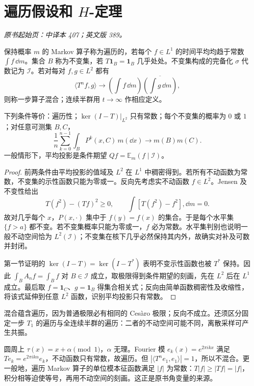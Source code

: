 \section{遍历假设和 \texorpdfstring{$H$}{H}-定理}\label{sec:yosida-13-03}
\noindent\textit{原书起始页：中译本 407；英文版 389。}

\begin{definition}[遍历与混合]
保持概率 $m$ 的 Markov 算子称为遍历的，若每个 $f\in L^1$ 的时间平均均趋于常数 $\int f\,\dd m$。集合 $B$ 称为不变集，若 $T\mathbf1_B=\mathbf1_B$ 几乎处处。不变集构成的完备化 $\sigma$ 代数记为 $\mathcal I$。若对每对 $f,g\in L^2$ 都有
\[
 \langle T^nf,g\rangle\longrightarrow
 \left(\int f\,\dd m\right)\overline{\left(\int g\,\dd m\right)},
\]
则称一步算子混合；连续半群用 $t\to\infty$ 作相应定义。
\end{definition}

\begin{theorem}[遍历性的等价表述]\label{thm:y13-ergodic-equivalence}
下列条件等价：遍历性；$\ker(I-T)|_{L^2}$ 只有常数；每个不变集的概率为 $0$ 或 $1$；对任意可测集 $B,C$，
\[
 \frac1n\sum_{k=0}^{n-1}\int_B P^k(x,C)\,m(\dd x)
 \longrightarrow m(B)m(C).
\]
一般情形下，平均投影是条件期望 $Qf=\mathbb E_m(f\mid\mathcal I)$。
\end{theorem}
\begin{proof}
前两条件由平均投影的值域及 $L^2$ 在 $L^1$ 中稠密得到。若所有不动函数为常数，不变集的示性函数只能为零或一。反向先考虑实不动函数 $f\in L^2$。Jensen 及不变性给出
\[
 T(f^2)-(Tf)^2\ge0,\qquad \int[T(f^2)-f^2],\dd m=0.
\]
故对几乎每个 $x$，$P(x,\cdot)$ 集中于 $f(y)=f(x)$ 的集合。于是每个水平集 $\{f>a\}$ 都不变。若不变集概率只能为零或一，$f$ 必为常数。水平集判别也说明一般不动空间恰为 $L^2(\mathcal I)$；不变集在核下几乎必然保持其内外，故确实对补及可数并封闭。

第一节证明的 $\ker(I-T)=\ker(I-T^*)$ 表明不变示性函数也被 $T^*$ 保持。因此 $\int_B A_nf=\int_B f$ 对 $B\in\mathcal I$ 成立，取极限得到条件期望的刻画，先在 $L^2$ 后在 $L^1$ 成立。最后取 $f=\mathbf1_C$、$g=\mathbf1_B$ 得集合相关式；反向由简单函数稠密性及收缩性，将该式延伸到任意 $L^2$ 函数，识别平均投影只有常数。
\end{proof}

混合蕴含遍历，因为普通极限必有相同的 Ces\`aro 极限；反向不成立。还须区分固定一步 $T_1$ 的遍历与全连续半群的遍历：二者的不动空间可能不同，离散采样可产生共振。

\begin{example}[无理旋转遍历但不混合]
圆周上 $\tau(x)=x+\alpha\pmod1$，$\alpha$ 无理。Fourier 模 $e_k(x)=e^{2\pi ikx}$ 满足 $Te_k=e^{2\pi ik\alpha}e_k$，不动函数只有常数，故遍历。但 $|\langle T^ne_1,e_1\rangle|=1$，所以不混合。更一般地，遍历 Markov 算子的单位模本征函数满足 $|f|$ 为常数：$T|f|\ge|Tf|=|f|$，积分相等迫使等号，再用不动空间的刻画。这正是原书角变量的来源。
\end{example}

